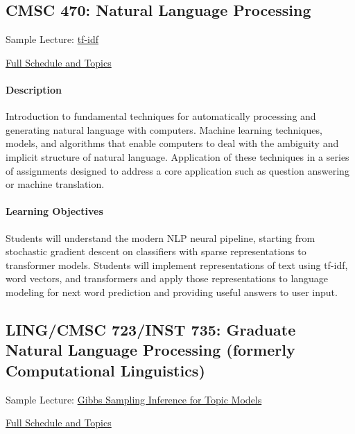 \documentclass{article}
\begin{document}
  \subsection{CMSC 470: Natural Language Processing}

  \begin{itemize*}
  \item Sample Lecture: \href{https://www.youtube.com/watch?v=A5ounv0D_cs}{tf-idf}
    \item \href{https://users.umiacs.umd.edu/~jbg/teaching/CMSC_470/}{Full Schedule and Topics}
    \end{itemize*}
  
  \paragraph{Description}
Introduction to fundamental techniques for automatically processing and generating natural language with computers. Machine learning techniques, models, and algorithms that enable computers to deal with the ambiguity and implicit structure of natural language. Application of these techniques in a series of assignments designed to address a core application such as question answering or machine translation.

  \paragraph{Learning Objectives}
  Students will understand the modern NLP neural pipeline, starting from stochastic gradient descent on classifiers with sparse representations to transformer models.  Students will implement representations of text using tf-idf, word vectors, and transformers and apply those representations to language modeling for next word prediction and providing useful answers to user input.

  

  

\subsection{LING/CMSC 723/INST 735: Graduate Natural Language Processing (formerly Computational Linguistics)}

\begin{itemize*}
\item Sample Lecture: \href{https://www.youtube.com/watch?v=u7l5hhmdc0M}{Gibbs Sampling Inference for Topic Models}
  \item \href{http://users.umiacs.umd.edu/~jbg/teaching/CMSC_723/}{Full Schedule and Topics}
\end{itemize*}
\end{document}
